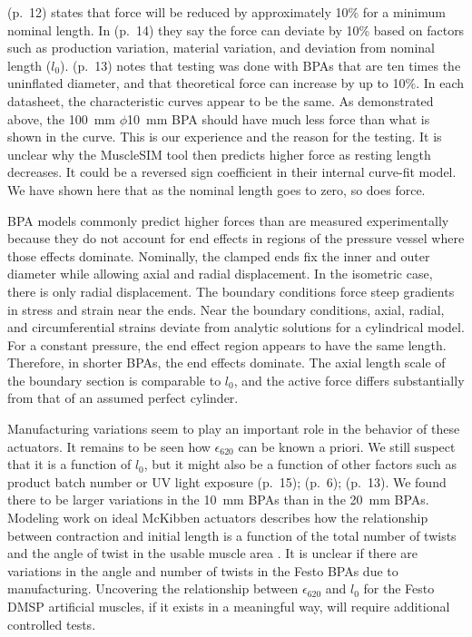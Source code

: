 \citet{festo_2026} (p.~12) states that force will be reduced by approximately 10\% for a minimum nominal length. In \citet{festo_2018} (p.~14) they say the force can deviate by 10\% based on factors such as production variation, material variation, and deviation from nominal length ($l_0$). \citet{festo_2013} (p.~13) notes that testing was done with BPAs that are ten times the uninflated diameter, and that theoretical force can increase by up to 10\%. In each datasheet, the characteristic curves appear to be the same. As demonstrated above, the \qty{100}{\mm} $\phi$\qty{10}{\mm} BPA should have much less force than what is shown in the curve. This is our experience and the reason for the testing. It is unclear why the MuscleSIM tool \citep{lang_robert_musclesim_2005} then predicts higher force as resting length decreases. It could be a reversed sign coefficient in their internal curve-fit model. We have shown here that as the nominal length goes to zero, so does force. 

BPA models commonly predict higher forces than are measured experimentally because they do not account for end effects in regions of the pressure vessel where those effects dominate.	Nominally, the clamped ends fix the inner and outer diameter while allowing axial and radial displacement. In the isometric case, there is only radial displacement. The boundary conditions force steep gradients in stress and strain near the ends. Near the boundary conditions, axial, radial, and circumferential strains deviate from analytic solutions for a cylindrical model. For a constant pressure, the end effect region appears to have the same length. Therefore, in shorter BPAs, the end effects dominate. The axial length scale of the boundary section is comparable to $l_0$,  and the active force differs substantially from that of an assumed perfect cylinder.

Manufacturing variations seem to play an important role in the behavior of these actuators. It remains to be seen how $\epsilon_{620}$ can be known a priori. We still suspect that it is a function of $l_0$, but it might also be a function of other factors such as product batch number or UV light exposure \citep{festo_2026} (p.~15); \citep{festo_2018} (p.~6); \citep{festo_2013} (p.~13). We found there to be larger variations in the \qtylist{10}{\mm} BPAs than in the \qtylist{20}{\mm} BPAs. Modeling work on ideal McKibben actuators describes how the relationship between contraction and initial length is a function of the total number of twists and the angle of twist in the usable muscle area \citep{chou_measurement_1996}. It is unclear if there are variations in the angle and number of twists in the Festo BPAs due to manufacturing. Uncovering the relationship between $\epsilon_{620}$ and $l_0$ for the Festo DMSP artificial muscles, if it exists in a meaningful way, will require additional controlled tests. 

